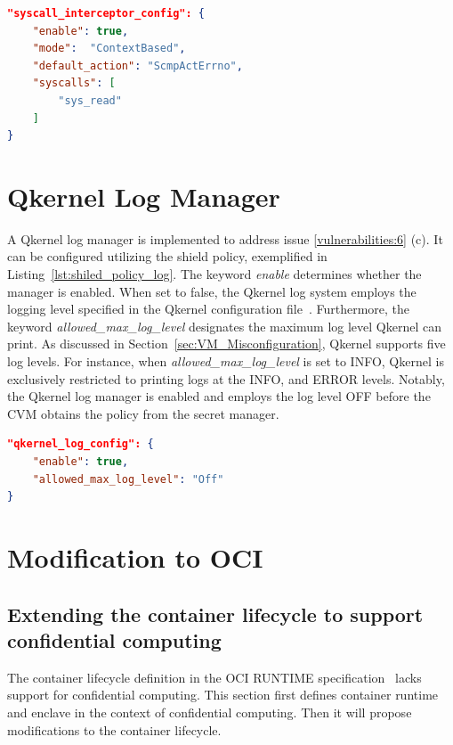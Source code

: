\begin{lstlisting}[language=json, caption= System call interceptor's configuration in the shield policy, label={lst:shiled_policy_interceptor}]
"syscall_interceptor_config": {
    "enable": true,
    "mode":  "ContextBased",
    "default_action": "ScmpActErrno",
    "syscalls": [
        "sys_read"
    ]
}
\end{lstlisting}

\section{Qkernel Log Manager}
\label{sec:Qkernel_logger}
A Qkernel log manager is implemented to address issue \ref{vulnerabilities:6} (c). It can be configured utilizing the shield policy, exemplified in Listing~\ref{lst:shiled_policy_log}. The keyword \emph{enable} determines whether the manager is enabled. When set to false, the Qkernel log system employs the logging level specified in 
the Qkernel configuration file~\cite*{quark_conf_file}. Furthermore, the keyword \emph{allowed\_max\_log\_level} designates the maximum log level Qkernel can print. As discussed in Section~\ref{sec:VM_Misconfiguration}, Qkernel supports five log levels. For instance, when \emph{allowed\_max\_log\_level} is set to INFO, Qkernel is exclusively 
restricted to printing logs at the INFO, and ERROR levels. Notably, the Qkernel log manager is enabled and employs the log level OFF before the \acrshort{CVM} obtains the policy from the secret manager.

\begin{lstlisting}[language=json, caption= Qkernel log manager's configuration in the shield policy, label={lst:shiled_policy_log}]
"qkernel_log_config": {
    "enable": true,
    "allowed_max_log_level": "Off"
}
\end{lstlisting}
    

\section{Modification to OCI}
\label{sec:Modification_OCI}

\subsection{Extending the container lifecycle to support confidential computing}
The container lifecycle definition in the OCI RUNTIME specification~\cite*{oci-runtime-spec} lacks support for confidential computing. This section first defines container runtime and enclave in the context of confidential computing. Then it will propose modifications to the container 
lifecycle.


